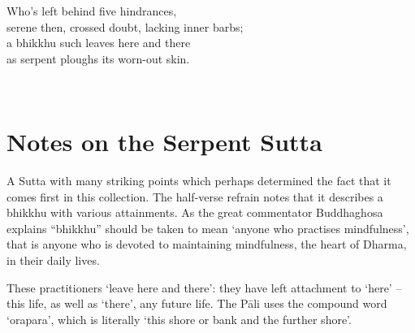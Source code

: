    \begin{MyDescription}{}
   	Who's left behind five hindrances,\\
   	   		serene then, crossed doubt, lacking inner barbs;\\
   	   		a bhikkhu such leaves here and there\\
   	   		as serpent ploughs its worn-out skin.	
      \end{MyDescription} 
\begin{MyDescription}[(Sn. 1 - 17)]{}
\end{MyDescription}    
   
\newpage    
   \section{Notes on the Serpent Sutta}
   
A Sutta with many striking points which perhaps determined the fact that it comes first in this collection. The half-verse refrain notes that it describes a bhikkhu with various attainments. As the great commentator Buddhaghosa explains “bhikkhu” should be taken to mean `anyone who practises mindfulness', that is anyone who is devoted to maintaining mindfulness, the heart of Dharma, in their daily lives.
   
These practitioners `leave here and there': they have left attachment to `here' – this life, as well as `there', any future life. The P\=ali  uses the compound word `orapara', which is literally `this shore or bank and the further shore'.

